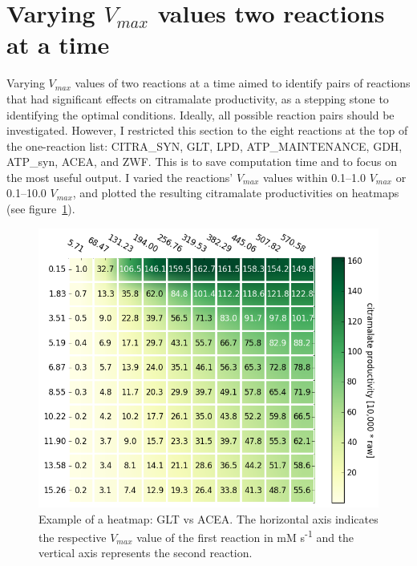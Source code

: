 \documentclass[parskip=full, numbers=noenddot]{scrreprt}
\begin{document}

\section{Varying $V_{max}$ values two reactions at a time}
\label{sec:couples}

Varying $V_{max}$ values of two reactions at a time aimed to identify pairs of reactions that had significant effects on citramalate productivity, as a stepping stone to identifying the optimal conditions. Ideally, all possible reaction pairs should be investigated. However, I restricted this section to the eight reactions at the top of the one-reaction list: CITRA\_SYN, GLT, LPD, ATP\_MAINTENANCE, GDH, ATP\_syn, ACEA, and ZWF. This is to save computation time and to focus on the most useful output. I varied the reactions' $V_{max}$ values within 0.1--1.0 $V_{max}$ or 0.1--10.0 $V_{max}$, and plotted the resulting citramalate productivities on heatmaps (see figure~\ref{fig:heatmapsample}). %

\begin{figure}[h]
  \centering
  \includegraphics[scale=0.5]{heatmapsample}
  \caption{Example of a heatmap: GLT vs ACEA. The horizontal axis indicates the respective $V_{max}$ value of the first reaction in mM s\textsuperscript{-1} and the vertical axis represents the second reaction.}
  \label{fig:heatmapsample}
\end{figure}
\end{document}
